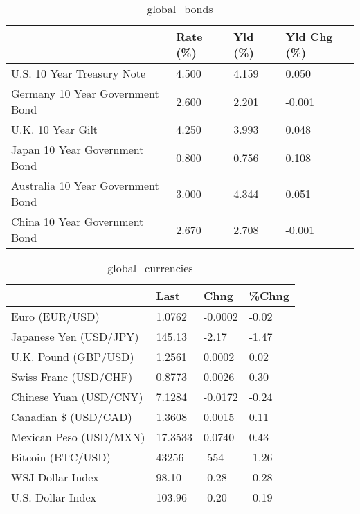 \documentclass{article}%
\begin{document}
%


\begin{table}[htbp]%
\caption{global\_bonds}%
\centering%
\begin{adjustbox}{width=1\textwidth}%
\begin{tabular}{llll}
\toprule
                                  & Rate (\%) & Yld (\%) & Yld Chg (\%) \\
\midrule
       U.S. 10 Year Treasury Note &    4.500 &   4.159 &       0.050 \\
  Germany 10 Year Government Bond &    2.600 &   2.201 &      -0.001 \\
                U.K. 10 Year Gilt &    4.250 &   3.993 &       0.048 \\
    Japan 10 Year Government Bond &    0.800 &   0.756 &       0.108 \\
Australia 10 Year Government Bond &    3.000 &   4.344 &       0.051 \\
    China 10 Year Government Bond &    2.670 &   2.708 &      -0.001 \\
\bottomrule
\end{tabular}
%
\end{adjustbox}%
\end{table}

%


\begin{table}[htbp]%
\caption{global\_currencies}%
\centering%
\begin{adjustbox}{width=1\textwidth}%
\begin{tabular}{llll}
\toprule
                       &    Last &    Chng & \%Chng \\
\midrule
        Euro (EUR/USD) &  1.0762 & -0.0002 & -0.02 \\
Japanese Yen (USD/JPY) &  145.13 &   -2.17 & -1.47 \\
  U.K. Pound (GBP/USD) &  1.2561 &  0.0002 &  0.02 \\
 Swiss Franc (USD/CHF) &  0.8773 &  0.0026 &  0.30 \\
Chinese Yuan (USD/CNY) &  7.1284 & -0.0172 & -0.24 \\
  Canadian \$ (USD/CAD) &  1.3608 &  0.0015 &  0.11 \\
Mexican Peso (USD/MXN) & 17.3533 &  0.0740 &  0.43 \\
     Bitcoin (BTC/USD) &   43256 &    -554 & -1.26 \\
      WSJ Dollar Index &   98.10 &   -0.28 & -0.28 \\
     U.S. Dollar Index &  103.96 &   -0.20 & -0.19 \\
\bottomrule
\end{tabular}
%
\end{adjustbox}%
\end{table}
\end{document}
